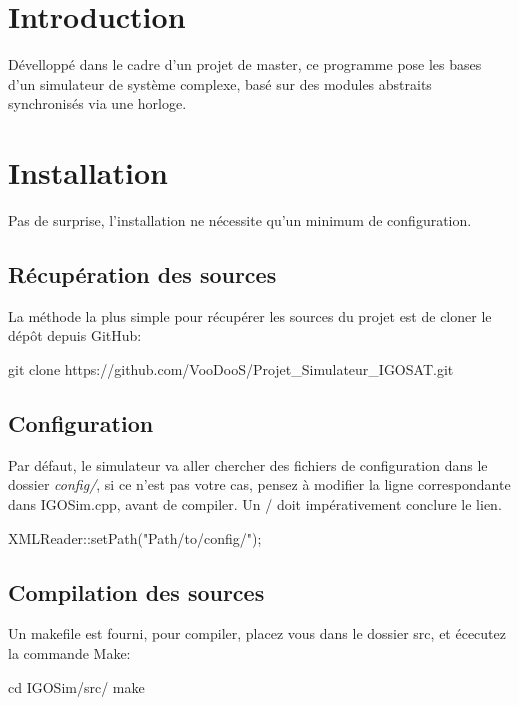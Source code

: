 \hypertarget{index_intro_sec}{}\section{Introduction}\label{index_intro_sec}
Dévelloppé dans le cadre d'un projet de master, ce programme pose les bases d'un simulateur de système complexe, basé sur des modules abstraits synchronisés via une horloge.\hypertarget{index_install_sec}{}\section{Installation}\label{index_install_sec}
Pas de surprise, l'installation ne nécessite qu'un minimum de configuration.\hypertarget{index_tools_subsec}{}\subsection{Récupération des sources}\label{index_tools_subsec}
La méthode la plus simple pour récupérer les sources du projet est de cloner le dépôt depuis Git\-Hub\-: \begin{DoxyVerb}git clone https://github.com/VooDooS/Projet_Simulateur_IGOSAT.git
\end{DoxyVerb}
\hypertarget{index_tools_cofig}{}\subsection{Configuration}\label{index_tools_cofig}
Par défaut, le simulateur va aller chercher des fichiers de configuration dans le dossier {\itshape config/}, si ce n'est pas votre cas, pensez à modifier la ligne correspondante dans I\-G\-O\-Sim.\-cpp, avant de compiler. Un / doit impérativement conclure le lien. \begin{DoxyVerb}XMLReader::setPath("Path/to/config/");
\end{DoxyVerb}
\hypertarget{index_tools_compil}{}\subsection{Compilation des sources}\label{index_tools_compil}
Un makefile est fourni, pour compiler, placez vous dans le dossier src, et écecutez la commande Make\-: \begin{DoxyVerb} cd IGOSim/src/
 make\end{DoxyVerb}
 